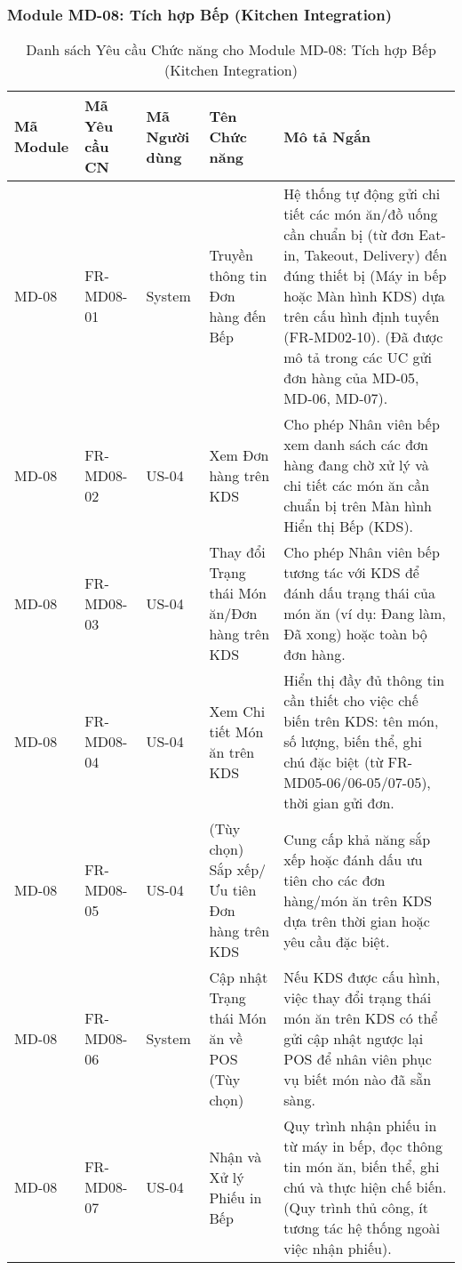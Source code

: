\subsubsection{Module MD-08: Tích hợp Bếp (Kitchen Integration)}


\begin{longtable}{|m{2cm}|m{2.5cm}|m{2cm}|m{4.5cm}|m{4cm}|}
\caption{Danh sách Yêu cầu Chức năng cho Module MD-08: Tích hợp Bếp (Kitchen Integration)} \label{tab:fr_md08} \\
\hline
\textbf{Mã Module} & \textbf{Mã Yêu cầu CN} & \textbf{Mã Người dùng} & \textbf{Tên Chức năng} & \textbf{Mô tả Ngắn} \\
\hline
\endhead %

\hline
\endfoot %

\hline
\endlastfoot %

MD-08 & FR-MD08-01 & System & Truyền thông tin Đơn hàng đến Bếp & Hệ thống tự động gửi chi tiết các món ăn/đồ uống cần chuẩn bị (từ đơn Eat-in, Takeout, Delivery) đến đúng thiết bị (Máy in bếp hoặc Màn hình KDS) dựa trên cấu hình định tuyến (FR-MD02-10). (Đã được mô tả trong các UC gửi đơn hàng của MD-05, MD-06, MD-07). \\
\hline
MD-08 & FR-MD08-02 & US-04 & Xem Đơn hàng trên KDS & Cho phép Nhân viên bếp xem danh sách các đơn hàng đang chờ xử lý và chi tiết các món ăn cần chuẩn bị trên Màn hình Hiển thị Bếp (KDS). \\
\hline
MD-08 & FR-MD08-03 & US-04 & Thay đổi Trạng thái Món ăn/Đơn hàng trên KDS & Cho phép Nhân viên bếp tương tác với KDS để đánh dấu trạng thái của món ăn (ví dụ: Đang làm, Đã xong) hoặc toàn bộ đơn hàng. \\
\hline
MD-08 & FR-MD08-04 & US-04 & Xem Chi tiết Món ăn trên KDS & Hiển thị đầy đủ thông tin cần thiết cho việc chế biến trên KDS: tên món, số lượng, biến thể, ghi chú đặc biệt (từ FR-MD05-06/06-05/07-05), thời gian gửi đơn. \\
\hline
MD-08 & FR-MD08-05 & US-04 & (Tùy chọn) Sắp xếp/Ưu tiên Đơn hàng trên KDS & Cung cấp khả năng sắp xếp hoặc đánh dấu ưu tiên cho các đơn hàng/món ăn trên KDS dựa trên thời gian hoặc yêu cầu đặc biệt. \\
\hline
MD-08 & FR-MD08-06 & System & Cập nhật Trạng thái Món ăn về POS (Tùy chọn) & Nếu KDS được cấu hình, việc thay đổi trạng thái món ăn trên KDS có thể gửi cập nhật ngược lại POS để nhân viên phục vụ biết món nào đã sẵn sàng. \\
\hline
MD-08 & FR-MD08-07 & US-04 & Nhận và Xử lý Phiếu in Bếp & Quy trình nhận phiếu in từ máy in bếp, đọc thông tin món ăn, biến thể, ghi chú và thực hiện chế biến. (Quy trình thủ công, ít tương tác hệ thống ngoài việc nhận phiếu). \\
\hline


\end{longtable}


